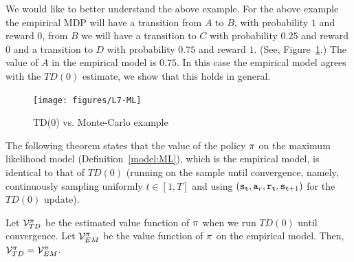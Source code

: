 We would like to better understand the above example. For the above
example the empirical MDP will have a transition from $A$ to $B$,
with probability $1$ and reward $0$, from $B$ we will have a
transition to $C$ with probability $0.25$ and reward $0$ and a
transition to $D$ with probability $0.75$ and reward $1$. (See,
Figure~\ref{fig:L7-ML}.) The value of $A$ in the empirical model is
$0.75$. In this case the empirical model agrees with the $TD(0)$
estimate, we show that this holds in general.


\begin{figure}
  \begin{centering}
  \texttt{[image: figures/L7-ML]}\\
  \caption{TD(0) vs. Monte-Carlo example}\label{fig:L7-ML}
  \end{centering}
\end{figure}



The following theorem states that the value of the policy $\pi$ on the maximum likelihood model (Definition~\ref{model:ML}), which is the
empirical model, is identical to that of $TD(0)$ (running on the
sample until convergence, namely, continuously sampling uniformly
$t\in[1,T]$ and using $({\tt s}_{\tt t},
{\tt a}_r,{\tt r}_{\tt t},{\tt s}_{{\tt t}+1})$ for the $TD(0)$
update).

\begin{theorem}
Let $\mathcal{V}^\pi_{TD}$ be the estimated value function of
$\pi$ when we run $TD(0)$ until convergence. Let
$\mathcal{V}^\pi_{EM}$ be the value function of $\pi$ on the
empirical model. Then, $\mathcal{V}^\pi_{TD}=\mathcal{V}^\pi_{EM}$.
\end{theorem}

